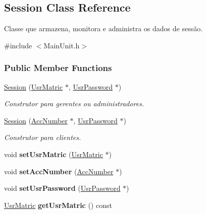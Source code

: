 \hypertarget{classSession}{\subsection{Session Class Reference}
\label{de/d41/classSession}
}


Classe que armazena, monitora e administra os dados de sessão.  




{\ttfamily \#include $<$Main\-Unit.\-h$>$}

\subsubsection*{Public Member Functions}
\begin{DoxyCompactItemize}
\item 
\hyperlink{classSession_a216a4f17b0c16bd7e2e5ace3c5500efa}{Session} (\hyperlink{classUsrMatric}{Usr\-Matric} $\ast$, \hyperlink{classUsrPassword}{Usr\-Password} $\ast$)
\begin{DoxyCompactList}\small\item\em Construtor para gerentes ou administradores. \end{DoxyCompactList}\item 
\hyperlink{classSession_ad94e7557f00ffe2abd64acf12d6f79d4}{Session} (\hyperlink{classAccNumber}{Acc\-Number} $\ast$, \hyperlink{classUsrPassword}{Usr\-Password} $\ast$)
\begin{DoxyCompactList}\small\item\em Construtor para clientes. \end{DoxyCompactList}\item 
\hypertarget{classSession_a8aff9f54e6d36a716794e7477820dc72}{void {\bfseries set\-Usr\-Matric} (\hyperlink{classUsrMatric}{Usr\-Matric} $\ast$)}\label{de/d41/classSession_a8aff9f54e6d36a716794e7477820dc72}

\item 
\hypertarget{classSession_a350981c1ca9d9eb3e3b78495a84a3acd}{void {\bfseries set\-Acc\-Number} (\hyperlink{classAccNumber}{Acc\-Number} $\ast$)}\label{de/d41/classSession_a350981c1ca9d9eb3e3b78495a84a3acd}

\item 
\hypertarget{classSession_a0c2ea92fd94940c314e6d5728bbe3725}{void {\bfseries set\-Usr\-Password} (\hyperlink{classUsrPassword}{Usr\-Password} $\ast$)}\label{de/d41/classSession_a0c2ea92fd94940c314e6d5728bbe3725}

\item 
\hypertarget{classSession_ab652b031c32df3f5c3c6ff4011477be9}{\hyperlink{classUsrMatric}{Usr\-Matric} {\bfseries get\-Usr\-Matric} () const }\label{de/d41/classSession_ab652b031c32df3f5c3c6ff4011477be9}


\end{DoxyCompactItemize}

